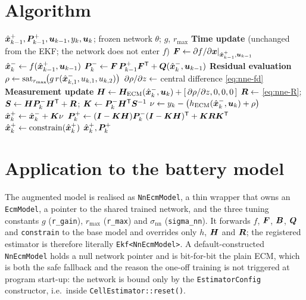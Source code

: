 \section{Algorithm}
\begin{algorithm}[H]
\caption{NN-EKF --- one sampling period (offline fit as in Chapter~\ref{ch:nndirect})}
\begin{algorithmic}[1]
\Require $\hat{\bm{x}}^{+}_{k-1}, \bm{P}^{+}_{k-1}, \bm{u}_{k-1}, y_k, \bm{u}_k$; frozen network $\theta$; $g$, $r_{\max}$
\Statex \textbf{Time update} (unchanged from the EKF; the network does not enter $f$)
\State $\bm{F} \gets \partial f/\partial\bm{x}|_{\hat{\bm{x}}^{+}_{k-1},\bm{u}_{k-1}}$
\State $\hat{\bm{x}}^{-}_k \gets f(\hat{\bm{x}}^{+}_{k-1},\bm{u}_{k-1})$
\State $\bm{P}^{-}_k \gets \bm{F}\,\bm{P}^{+}_{k-1}\bm{F}^{\mathsf{T}} + \bm{Q}(\hat{\bm{x}}^{-}_k,\bm{u}_{k-1})$
\Statex \textbf{Residual evaluation}
\State $\rho \gets \operatorname{sat}_{r_{\max}}\!\bigl(g\,r(\hat{\bm{x}}^{-}_{k,1}, u_{k,1}, u_{k,2})\bigr)$ 
\State $\partial\rho/\partial z \gets$ central difference \cref{eq:nne-fd} 
\Statex \textbf{Measurement update}
\State $\bm{H} \gets \bm{H}_{\mathrm{ECM}}(\hat{\bm{x}}^{-}_k,\bm{u}_k) + [\,\partial\rho/\partial z,0,0,0\,]$
\State $\bm{R} \gets$ \cref{eq:nne-R};\quad $\bm{S} \gets \bm{H}\bm{P}^{-}_k\bm{H}^{\mathsf{T}} + \bm{R}$;\quad
       $\bm{K} \gets \bm{P}^{-}_k \bm{H}^{\mathsf{T}} \bm{S}^{-1}$
\State $\nu \gets y_k - \bigl(h_{\mathrm{ECM}}(\hat{\bm{x}}^{-}_k,\bm{u}_k) + \rho\bigr)$
\State $\hat{\bm{x}}^{+}_k \gets \hat{\bm{x}}^{-}_k + \bm{K}\nu$
\State $\bm{P}^{+}_k \gets (\bm{I}-\bm{K}\bm{H})\bm{P}^{-}_k(\bm{I}-\bm{K}\bm{H})^{\mathsf{T}} + \bm{K}\bm{R}\bm{K}^{\mathsf{T}}$ 
\State $\hat{\bm{x}}^{+}_k \gets \operatorname{constrain}(\hat{\bm{x}}^{+}_k)$ 
\Ensure $\hat{\bm{x}}^{+}_k, \bm{P}^{+}_k$
\end{algorithmic}
\end{algorithm}

\section{Application to the battery model}
The augmented model is realised as \texttt{NnEcmModel}, a thin wrapper that owns an
\texttt{EcmModel}, a pointer to the shared trained network, and the three tuning constants
$g$ (\texttt{r\_gain}), $r_{\max}$ (\texttt{r\_max}) and $\sigma_{\mathrm{nn}}$
(\texttt{sigma\_nn}).  It forwards $f$, $\bm{F}$, $\bm{B}$, $\bm{Q}$ and \texttt{constrain} to the base
model and overrides only $h$, $\bm{H}$ and $\bm{R}$; the registered estimator is therefore literally
\texttt{Ekf<NnEcmModel>}.  A default-constructed \texttt{NnEcmModel} holds a null network pointer
and is bit-for-bit the plain ECM, which is both the safe fallback and the reason the one-off
training is not triggered at program start-up: the network is bound only by the
\texttt{EstimatorConfig} constructor, i.e.\ inside \texttt{CellEstimator::reset()}.

